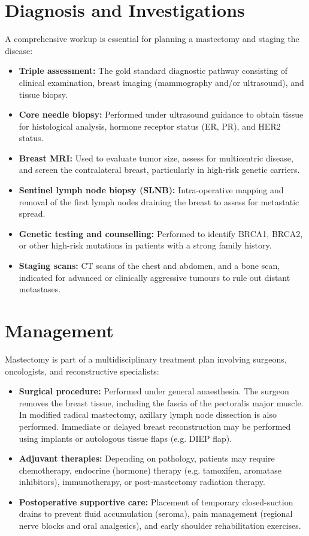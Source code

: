 \section*{Diagnosis and Investigations}
A comprehensive workup is essential for planning a mastectomy and staging the disease:
\begin{itemize}
    \item \textbf{Triple assessment:} The gold standard diagnostic pathway consisting of clinical examination, breast imaging (mammography and/or ultrasound), and tissue biopsy.
    \item \textbf{Core needle biopsy:} Performed under ultrasound guidance to obtain tissue for histological analysis, hormone receptor status (ER, PR), and HER2 status.
    \item \textbf{Breast MRI:} Used to evaluate tumor size, assess for multicentric disease, and screen the contralateral breast, particularly in high-risk genetic carriers.
    \item \textbf{Sentinel lymph node biopsy (SLNB):} Intra-operative mapping and removal of the first lymph nodes draining the breast to assess for metastatic spread.
    \item \textbf{Genetic testing and counselling:} Performed to identify BRCA1, BRCA2, or other high-risk mutations in patients with a strong family history.
    \item \textbf{Staging scans:} CT scans of the chest and abdomen, and a bone scan, indicated for advanced or clinically aggressive tumours to rule out distant metastases.
\end{itemize}

\section*{Management}
Mastectomy is part of a multidisciplinary treatment plan involving surgeons, oncologists, and reconstructive specialists:
\begin{itemize}
    \item \textbf{Surgical procedure:} Performed under general anaesthesia. The surgeon removes the breast tissue, including the fascia of the pectoralis major muscle. In modified radical mastectomy, axillary lymph node dissection is also performed. Immediate or delayed breast reconstruction may be performed using implants or autologous tissue flaps (e.g. DIEP flap).
    \item \textbf{Adjuvant therapies:} Depending on pathology, patients may require chemotherapy, endocrine (hormone) therapy (e.g. tamoxifen, aromatase inhibitors), immunotherapy, or post-mastectomy radiation therapy.
    \item \textbf{Postoperative supportive care:} Placement of temporary closed-suction drains to prevent fluid accumulation (seroma), pain management (regional nerve blocks and oral analgesics), and early shoulder rehabilitation exercises.
\end{itemize}


